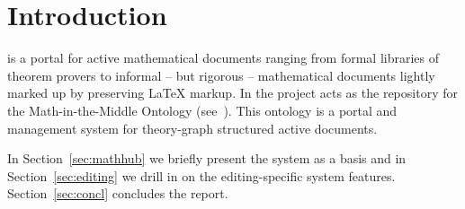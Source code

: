 \section{Introduction}\label{sec:intro}

\sys is a portal for active mathematical documents ranging from formal libraries
of theorem provers to informal -- but rigorous -- mathematical documents lightly marked up
by preserving {\LaTeX} markup. In the \pn project \sys acts as the repository for the
Math-in-the-Middle Ontology (see~\cite{DehKohKon:iop16,ODK-D6.2}). This ontology is a
portal and management system for theory-graph structured active documents. 

In Section~\ref{sec:mathhub} we briefly present the \sys system as a basis and in
Section~\ref{sec:editing} we drill in on the editing-specific system
features. Section~\ref{sec:concl} concludes the report. 


